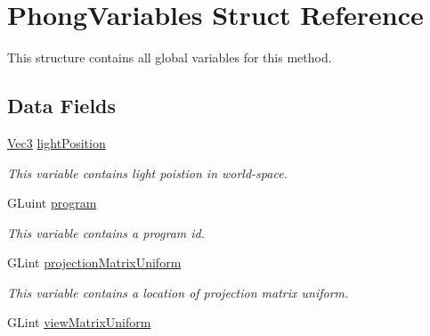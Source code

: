 \hypertarget{structPhongVariables}{\section{Phong\-Variables Struct Reference}
\label{structPhongVariables}
}


This structure contains all global variables for this method.  


\subsection*{Data Fields}
\begin{DoxyCompactItemize}
\item 
\hypertarget{structPhongVariables_aab37c6c27bf6eac7d326a34afb74c90c}{\hyperlink{structVec3}{Vec3} \hyperlink{structPhongVariables_aab37c6c27bf6eac7d326a34afb74c90c}{light\-Position}}\label{structPhongVariables_aab37c6c27bf6eac7d326a34afb74c90c}

\begin{DoxyCompactList}\small\item\em This variable contains light poistion in world-\/space. \end{DoxyCompactList}\item 
\hypertarget{structPhongVariables_a79e282dccbf349a3aac5ff84a28816f9}{G\-Luint \hyperlink{structPhongVariables_a79e282dccbf349a3aac5ff84a28816f9}{program}}\label{structPhongVariables_a79e282dccbf349a3aac5ff84a28816f9}

\begin{DoxyCompactList}\small\item\em This variable contains a program id. \end{DoxyCompactList}\item 
\hypertarget{structPhongVariables_a8c61b1c9c38e80b57a13b0f87807374f}{G\-Lint \hyperlink{structPhongVariables_a8c61b1c9c38e80b57a13b0f87807374f}{projection\-Matrix\-Uniform}}\label{structPhongVariables_a8c61b1c9c38e80b57a13b0f87807374f}

\begin{DoxyCompactList}\small\item\em This variable contains a location of projection matrix uniform. \end{DoxyCompactList}\item 
\hypertarget{structPhongVariables_abbfc97af1616e8af7f792bbb54f39a50}{G\-Lint \hyperlink{structPhongVariables_abbfc97af1616e8af7f792bbb54f39a50}{view\-Matrix\-Uniform}}\label{structPhongVariables_abbfc97af1616e8af7f792bbb54f39a50}


\end{DoxyCompactItemize}
